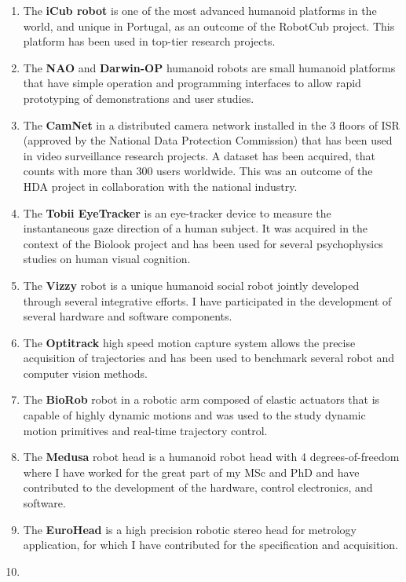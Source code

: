 \begin{enumerate}
\def\labelenumi{\arabic{enumi}.}
\item
  The \textbf{iCub robot} is one of the most advanced humanoid platforms
  in the world, and unique in Portugal, as an outcome of the RobotCub
  project. This platform has been used in top-tier research projects.
\item
  The \textbf{NAO} and \textbf{Darwin-OP} humanoid robots are small
  humanoid platforms that have simple operation and programming
  interfaces to allow rapid prototyping of demonstrations and user
  studies.
\item
  The \textbf{CamNet} in a distributed camera network installed in the 3
  floors of ISR (approved by the National Data Protection Commission)
  that has been used in video surveillance research projects. A dataset
  has been acquired, that counts with more than 300 users worldwide.
  This was an outcome of the HDA project in collaboration with the
  national industry.
\item
  The \textbf{Tobii EyeTracker} is an eye-tracker device to measure the
  instantaneous gaze direction of a human subject. It was acquired in
  the context of the Biolook project and has been used for several
  psychophysics studies on human visual cognition.
\item
  The \textbf{Vizzy} robot is a unique humanoid social robot jointly
  developed through several integrative efforts. I have participated in
  the development of several hardware and software components.
\item
  The \textbf{Optitrack} high speed motion capture system allows the
  precise acquisition of trajectories and has been used to benchmark
  several robot and computer vision methods.
\item
  The \textbf{BioRob} robot in a robotic arm composed of elastic
  actuators that is capable of highly dynamic motions and was used to
  the study dynamic motion primitives and real-time trajectory control.
\item
  The \textbf{Medusa} robot head is a humanoid robot head with 4
  degrees-of-freedom where I have worked for the great part of my MSc
  and PhD and have contributed to the development of the hardware,
  control electronics, and software.
\item
  The \textbf{EuroHead} is a high precision robotic stereo head for
  metrology application, for which I have contributed for the
  specification and acquisition.
\item

\end{enumerate}

